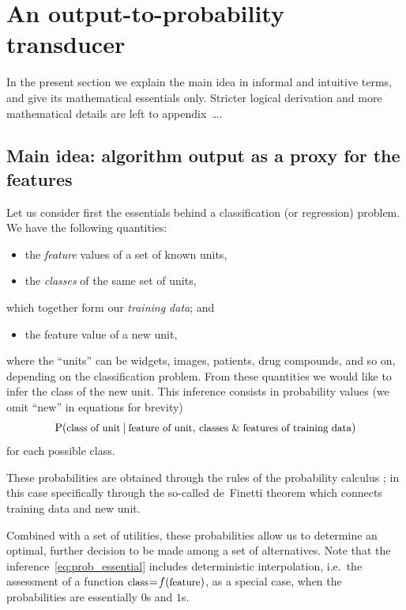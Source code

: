 \documentclass[\ifafour a4paper,12pt,\else a5paper,10pt,\fi%
onecolumn,oneside,article,%
british%
]{memoir}
\theoremstyle{remark}
\theoremstyle{innote}
\newcommand*{\amp}{\&}
\newcommand*{\pencil}{{\fontencoding{U}\fontfamily{fontawesometwo}\selectfont\symbol{210}}}
\newcommand{\mynotep}[1]{{\footnotesize\color{notecolour}\pencil\ #1}}
\renewcommand*{\P}{\mathrm{P}}%
\renewcommand*{\|}[1][]{\nonscript\:#1\vert\nonscript\:\mathopen{}}
\newcommand*{\mo}[1][=]{\mathrel{\mkern-3.5mu#1\mkern-3.5mu}}
\newcommand*{\chap}{ch.}%
\newcommand*{\chaps}{chs}%
\newcommand*{\ie}{{i.e.}}
\newcommand*{\texts}[1]{\text{\small #1}}
\begin{document}
\section{An output-to-probability transducer}
\label{sec:transducer}

In the present section we explain the main idea in informal and intuitive terms, and give its  mathematical essentials only. Stricter logical derivation and more mathematical details are left to appendix\mynotep{\ldots}.



\subsection{Main idea: algorithm output as a proxy for the features}
\label{sec:essential_idea}

Let us consider first the essentials behind a classification (or regression) problem. We have the following quantities:
\begin{itemize}
\item the \emph{feature} values of a set of known units,
\item the \emph{classes} of the same set of units,
\end{itemize}
which together form our \emph{training data}; and
\begin{itemize}[resume]
\item the feature value of a new unit,
\end{itemize}
where the \enquote{units} can be widgets, images, patients, drug compounds, and so on, depending on the classification problem. From these quantities we would like to infer the class of the new unit. This inference consists in probability values (we omit \enquote{new} in equations for brevity)
\begin{equation}
  \label{eq:prob_essential}
  \P(\texts{class of unit} \| \texts{feature of unit},\,
  \texts{classes \amp\ features of training data})
\end{equation}
for each possible class.

These probabilities are obtained through the rules of the probability calculus \autocites{jaynes1994_r2003}[\chaps~12--13]{russelletal1995_r2022}{gregory2005,hailperin2011,jeffreys1939_r1983}; in this case specifically through the so-called de~Finetti theorem \autocites[\chap~4]{bernardoetal1994_r2000}{dawid2013} which connects training data and new unit.

Combined with a set of utilities, these probabilities allow us to determine an optimal, further decision to be made among a set of alternatives. Note that the inference~\eqref{eq:prob_essential} includes deterministic interpolation, \ie\ the assessment of a function $\texts{class} \mo f(\texts{feature})$, as a special case, when the probabilities are essentially $0$s and $1$s.
\end{document}
